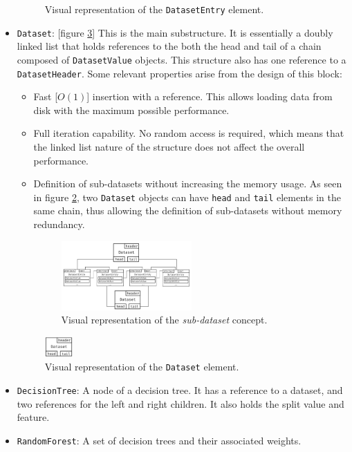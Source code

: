 \documentclass{acm_proc_article-sp}
\begin{document}
\begin{itemize}
\begin{figure}[h]
    \caption{Visual representation of the \texttt{DatasetEntry} element.}
    \label{fig:datasetentryblock}
  \end{figure}
  \item \texttt{Dataset}: [figure \ref{fig:datasetblock}] This is the main substructure. It is essentially a doubly linked list that holds references to the both the head and tail of a chain composed of \texttt{DatasetValue} objects. This structure also has one reference to a \texttt{DatasetHeader}. Some relevant properties arise from the design of this block:
  \begin{itemize}
    \item Fast [$O(1)$] insertion with a reference. This allows loading data from disk with the maximum possible performance.
    \item Full iteration capability. No random access is required, which means that the linked list nature of the structure does not affect the overall performance.
    \item Definition of sub-datasets without increasing the memory usage. As seen in figure \ref{fig:subdataset}, two \texttt{Dataset} objects can have \texttt{head} and \texttt{tail} elements in the same chain, thus allowing the definition of sub-datasets without memory redundancy.
    \begin{figure}[h]
      \centering
      \includegraphics[width=0.5\textwidth]{subdataset}
      \caption{Visual representation of the \textit{sub-dataset} concept.}
      \label{fig:subdataset}
    \end{figure}
  \end{itemize}
  \begin{figure}[h]
    \centering
    \includegraphics[width=0.10\textwidth]{datasetblock}
    \caption{Visual representation of the \texttt{Dataset} element.}
    \label{fig:datasetblock}
  \end{figure}
  \item \texttt{DecisionTree}: A node of a decision tree. It has a reference to a dataset, and two references for the left and right children. It also holds the split value and feature.
  \item \texttt{RandomForest}: A set of decision trees and their associated weights.
\end{itemize}
\end{document}
